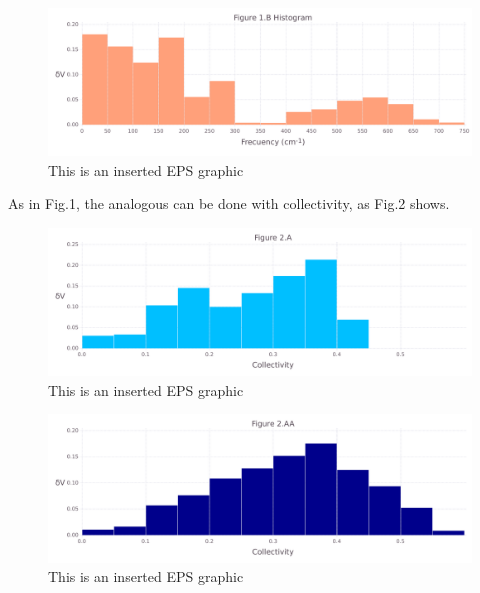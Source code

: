 \documentclass[10pt,letterpaper]{article}
\begin{document}
\begin{figure}[ht]
\begin{center}
\includegraphics[scale=0.5]{1xkk/1bfigure.pdf}
\caption{This is an inserted EPS graphic}
\label{fig2}
\end{center}
\end{figure}

\clearpage
As in Fig.1, the analogous can be done with collectivity, as Fig.2 shows.

\begin{figure}[ht]
\begin{center}
\includegraphics[scale=0.5]{1xkk/2afigure.pdf}
\caption{This is an inserted EPS graphic}
\label{fig3}
\end{center}
\end{figure}

\begin{figure}[ht]
\begin{center}
\includegraphics[scale=0.5]{1xkk/2aafigure.pdf}
\caption{This is an inserted EPS graphic}
\label{fig4}
\end{center}
\end{figure}
\end{document}
